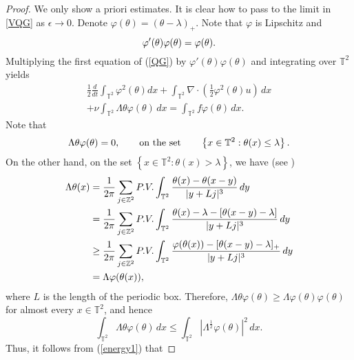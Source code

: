 \documentclass{amsart}
\numberwithin{Theorem}{section}
\theoremstyle{definition}
\theoremstyle{remark}
\newcommand{\e}{\epsilon}
\begin{document}
\begin{proof}

We only show a priori estimates. It is clear how to pass to the limit in \eqref{VQG} as $\e \to 0$.
Denote $\varphi(\theta)=(\theta-\lambda)_+$. Note that $\varphi$ is Lipschitz and 
\begin{equation}\notag
\varphi'(\theta)\varphi(\theta)=\varphi(\theta).
\end{equation}
Multiplying the first equation of (\ref{QG}) by $\varphi'(\theta)\varphi(\theta)$ and integrating over $\mathbb T^2$ yields
\begin{equation}\label{energy1}
\begin{split}
\frac{1}{2}\frac{d}{dt}\int_{\mathbb T^2}\varphi^2(\theta)dx+\int_{\mathbb T^2}\nabla\cdot\left(\frac{1}{2}\varphi^2(\theta)u\right)\, dx\\
+\nu\int_{\mathbb T^2}\Lambda\theta\varphi(\theta)\, dx
=\int_{\mathbb T^2}f\varphi(\theta)\, dx.
\end{split}
\end{equation}
Note that 
\begin{equation}\notag
\Lambda\theta\varphi(\theta)=0,  \qquad \mbox {on the set} \qquad \left\{ x\in\mathbb T^2: \theta(x)\leq \lambda\right\}.
\end{equation}
On the other hand, on the set $\left\{ x\in\mathbb T^2: \theta(x)> \lambda\right\}$, we have (see \cite{CC})
\begin{equation}\notag
\begin{split}
\Lambda\theta(x)&=\frac{1}{2\pi}\sum_{j\in \mathbb Z^2} P.V. \int_{\mathbb T^2}\frac{\theta(x)-\theta(x-y)}{|y+Lj|^3}\, dy\\
&=\frac{1}{2\pi}\sum_{j\in \mathbb Z^2}P.V.\int_{\mathbb T^2}\frac{\theta(x)-\lambda-[\theta(x-y)-\lambda]}{|y+Lj|^3}\, dy\\
&\geq \frac{1}{2\pi}\sum_{j\in \mathbb Z^2} P.V.\int_{\mathbb T^2}\frac{\varphi(\theta(x))-[\theta(x-y)-\lambda]_+}{|y+Lj|^3}\, dy\\
&=\Lambda\varphi(\theta(x)),
\end{split}
\end{equation}
where $L$ is the length of the periodic box.
Therefore, $\Lambda\theta \varphi(\theta) \geq  \Lambda\varphi(\theta)\varphi(\theta)$ for almost every $x\in\mathbb T^2$, and hence
\[
\int_{\mathbb T^2}\Lambda \theta \varphi(\theta)\, dx \leq  \int_{\mathbb T^2}\left|\Lambda^{\frac{1}{2}}\varphi(\theta)\right|^2\, dx.
\]
 Thus, it follows from (\ref{energy1}) that

\end{proof}
\end{document}
